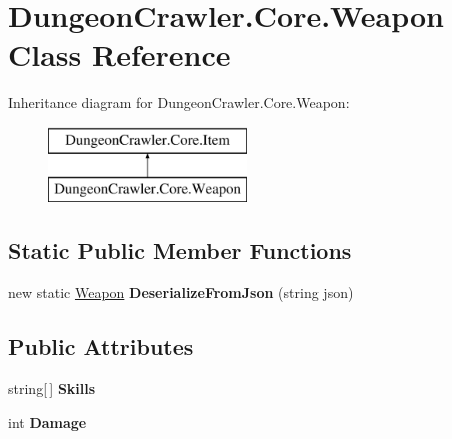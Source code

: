 \hypertarget{class_dungeon_crawler_1_1_core_1_1_weapon}{}\section{Dungeon\+Crawler.\+Core.\+Weapon Class Reference}
\label{class_dungeon_crawler_1_1_core_1_1_weapon}
Inheritance diagram for Dungeon\+Crawler.\+Core.\+Weapon\+:\begin{figure}[H]
\begin{center}
\leavevmode
\includegraphics[height=2.000000cm]{class_dungeon_crawler_1_1_core_1_1_weapon}
\end{center}
\end{figure}
\subsection*{Static Public Member Functions}
\begin{DoxyCompactItemize}
\item 
\hypertarget{class_dungeon_crawler_1_1_core_1_1_weapon_a6d99de4da4b070ee5e5dbeef5e5f7481}{}new static \hyperlink{class_dungeon_crawler_1_1_core_1_1_weapon}{Weapon} {\bfseries Deserialize\+From\+Json} (string json)\label{class_dungeon_crawler_1_1_core_1_1_weapon_a6d99de4da4b070ee5e5dbeef5e5f7481}

\end{DoxyCompactItemize}
\subsection*{Public Attributes}
\begin{DoxyCompactItemize}
\item 
\hypertarget{class_dungeon_crawler_1_1_core_1_1_weapon_a320a9cc5a44478e81ce852b88557f03d}{}string\mbox{[}$\,$\mbox{]} {\bfseries Skills}\label{class_dungeon_crawler_1_1_core_1_1_weapon_a320a9cc5a44478e81ce852b88557f03d}

\item 
\hypertarget{class_dungeon_crawler_1_1_core_1_1_weapon_a2638db696abeed45dc2327e7c0e1e7ea}{}int {\bfseries Damage}\label{class_dungeon_crawler_1_1_core_1_1_weapon_a2638db696abeed45dc2327e7c0e1e7ea}

\end{DoxyCompactItemize}
